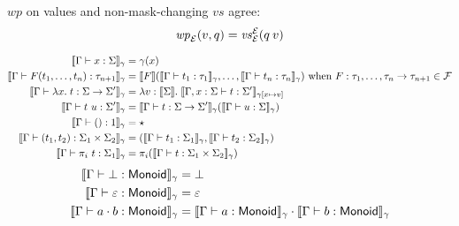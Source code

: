 \begin{lem}
	$\mathit{wp}$ on values and non-mask-changing $\mathit{vs}$ agree:
	\[ \mathit{wp}_{\mathcal{E}}(v, q) = \mathit{vs}_{\mathcal{E}}^{\mathcal{E}}(q \: v)  \]
\end{lem}



\begin{align*}
	\Sem{\vctx \proves x : \sort}_\gamma &= \gamma(x) \\
	\Sem{\vctx \proves \sigfn(\term_1, \dots, \term_n) : \type_{n+1}}_\gamma &= \Sem{\sigfn}(\Sem{\vctx \proves \term_1 : \type_1}_\gamma, \dots, \Sem{\vctx \proves \term_n : \type_n}_\gamma) \ \WHEN \sigfn : \type_1, \dots, \type_n \to \type_{n+1} \in \SigFn \\
	\Sem{\vctx \proves \Lam x. \term : \sort \to \sort'}_\gamma &=
	\Lam v : \Sem{\sort}. \Sem{\vctx, x : \sort \proves \term : \sort'}_{\gamma[x \mapsto v]} \\
	\Sem{\vctx \proves \term~\termB : \sort'}_\gamma &=
	\Sem{\vctx \proves \term : \sort \to \sort'}_\gamma(\Sem{\vctx \proves \termB : \sort}_\gamma) \\
	\Sem{\vctx \proves \unitval : \unitsort}_\gamma &= \star \\
	\Sem{\vctx \proves (\term_1, \term_2) : \sort_1 \times \sort_2}_\gamma &= (\Sem{\vctx \proves \term_1 : \sort_1}_\gamma, \Sem{\vctx \proves \term_2 : \sort_2}_\gamma) \\
	\Sem{\vctx \proves \pi_i~\term : \sort_1}_\gamma &= \pi_i(\Sem{\vctx \proves \term : \sort_1 \times \sort_2}_\gamma)
\end{align*}
%
\begin{align*}
	\llbracket \Gamma \vdash \bot : \textsf{Monoid} \rrbracket_\gamma &= \bot \\
	\llbracket \Gamma \vdash \mathord{\varepsilon} : \textsf{Monoid} \rrbracket_\gamma &= \mathord{\varepsilon} \\
	\llbracket \Gamma \vdash a \mathbin{\cdot} b : \textsf{Monoid} \rrbracket_\gamma &=
	\llbracket \Gamma \vdash a : \textsf{Monoid} \rrbracket_\gamma \mathbin{\cdot} \llbracket \Gamma \vdash b : \textsf{Monoid} \rrbracket_\gamma
\end{align*}
%
